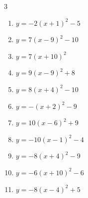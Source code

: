 \begin{multicols}{3}
\begin{enumerate}
        \phantom{$\displaystyle 頂点\left( 8 , 10 \right)$}

  \item $\displaystyle y=-2\left( x+1\right)^{2}-5$

        \phantom{$\displaystyle 頂点\left( -1 , -5 \right)$}

  \item $\displaystyle y=7\left( x-9\right)^{2}-10$

        \phantom{$\displaystyle 頂点\left( 9 , -10 \right)$}

  \item $\displaystyle y=7\left( x+10\right)^{2}$

        \phantom{$\displaystyle 頂点\left( -10 , 0 \right)$}

  \item $\displaystyle y=9\left( x-9\right)^{2}+8$

        \phantom{$\displaystyle 頂点\left( 9 , 8 \right)$}

  \item $\displaystyle y=8\left( x+4\right)^{2}-10$

        \phantom{$\displaystyle 頂点\left( -4 , -10 \right)$}

  \item $\displaystyle y=-\left( x+2\right)^{2}-9$

        \phantom{$\displaystyle 頂点\left( -2 , -9 \right)$}

  \item $\displaystyle y=10\left( x-6\right)^{2}+9$

        \phantom{$\displaystyle 頂点\left( 6 , 9 \right)$}

  \item $\displaystyle y=-10\left( x-1\right)^{2}-4$

        \phantom{$\displaystyle 頂点\left( 1 , -4 \right)$}

  \item $\displaystyle y=-8\left( x+4\right)^{2}-9$

        \phantom{$\displaystyle 頂点\left( -4 , -9 \right)$}

  \item $\displaystyle y=-6\left( x+10\right)^{2}-6$

        \phantom{$\displaystyle 頂点\left( -10 , -6 \right)$}

  \item $\displaystyle y=-8\left( x-4\right)^{2}+5$

        \phantom{$\displaystyle 頂点\left( 4 , 5 \right)$}


\end{enumerate}
\end{multicols}
